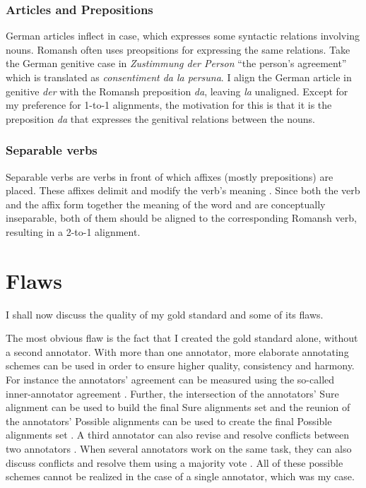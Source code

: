 \subsubsection{Articles and Prepositions}
German articles inflect in case, which expresses some syntactic relations involving nouns. 
Romansh often uses preopsitions for expressing the same relations. 
Take the German genitive case in \emph{Zustimmung der Person} \enquote{the person's agreement} which is translated as \emph{consentiment da la persuna}. 
I align the German article in genitive  \emph{der} with the Romansh preposition \emph{da}, leaving \emph{la} unaligned. 
Except for my preference for 1-to-1 alignments, the motivation for this is that it is the preposition \emph{da} that expresses the genitival relations between the nouns.

\subsubsection{Separable verbs}
Separable verbs are verbs in front of which affixes (mostly prepositions) are placed. 
These affixes delimit and modify the verb's meaning \autocite[47]{dryer-2009}. 
Since both the verb and the affix form together the meaning of the word and are conceptually inseparable, both of them should be aligned to the corresponding Romansh verb, resulting in a 2-to-1 alignment.

\section{Flaws}
\label{sec:gold-flaws}
I shall now discuss the quality of my gold standard and some of its flaws.

The most obvious flaw is the fact that I created the gold standard alone, without a second annotator. 
With more than one annotator, more elaborate annotating schemes can be used in order to ensure higher quality, consistency and harmony. 
For instance the annotators' agreement can be measured using the so-called inner-annotator agreement \autocite{holmqvist-ahrenberg-2011-gold}. 
Further, the intersection of the annotators' Sure alignment can be used to build the final Sure alignments set and the reunion of the annotators' Possible alignments can be used to create the final Possible alignments set \autocite{mihalcea-pedersen-2003-evaluation}.
A third annotator can also revise and resolve conflicts between two annotators \autocite{mihalcea-pedersen-2003-evaluation}.
When several annotators work on the same task, they can also discuss conflicts and resolve them using a majority vote \autocite{DBLP:journals/corr/cmp-lg-9805004}.
All of these possible schemes cannot be realized in the case of a single annotator, which was my case.

